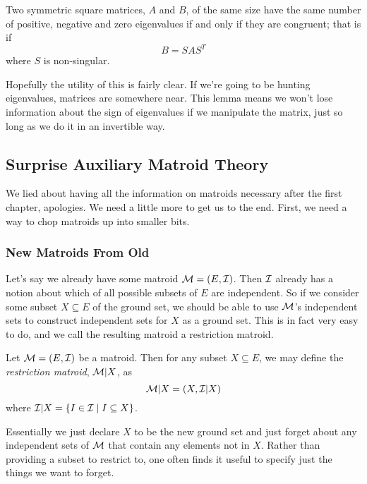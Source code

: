 \documentclass[12pt,oneside]{../../sfsuthesis}
\begin{document}
\begin{lemma}\th\label{thm:sylvester}
    Two symmetric square matrices, \( A \) and \( B \), of the same size have the same number of positive, negative and zero eigenvalues if and only if they are congruent;
    that is if
    \[
        B = SAS^{T}
    \]
    where \( S \) is non-singular.
\end{lemma}

Hopefully the utility of this is fairly clear.
If we're going to be hunting eigenvalues, matrices are somewhere near.
This lemma means we won't lose information about the sign of eigenvalues if we manipulate the matrix, just so long as we do it in an invertible way.

\subsection{Surprise Auxiliary Matroid Theory}

We lied about having all the information on matroids necessary after the first chapter, apologies.
We need a little more to get us to the end.
First, we need a way to chop matroids up into smaller bits.

\subsubsection{New Matroids From Old}
Let's say we already have some matroid \( \mathcal{M} = (E, \mathcal{I}) \).
Then \( \mathcal{I} \) already has a notion about which of all possible subsets of \( E \) are independent.
So if we consider some subset \( X \subseteq E \) of the ground set, we should be able to use \( \mathcal{M} \)'s independent sets to construct independent sets for \( X \) as a ground set.
This is in fact very easy to do, and we call the resulting matroid a restriction matroid.

\begin{definition}\th\label{def:restrictionMatroid}
    Let \( \mathcal{M} = (E, \mathcal{I}) \) be a matroid.
    Then for any subset \( X \subseteq E \), we may define the \emph{restriction matroid}, \( \mathcal{M}|X \), as
    \[
        \mathcal{M}|X = ( X, \mathcal{I}|X )
    \]
    where \( \mathcal{I}|X = \{I \in \mathcal{I} \; | \; I \subseteq X\} \).
\end{definition}

Essentially we just declare \( X \) to be the new ground set and just forget about any independent sets of \( \mathcal{M} \) that contain any elements not in \( X \).
Rather than providing a subset to restrict to, one often finds it useful to specify just the things we want to forget.
\end{document}
